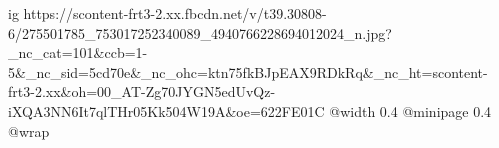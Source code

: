  
 
 
 
 

\ifcmt
  ig https://scontent-frt3-2.xx.fbcdn.net/v/t39.30808-6/275501785_753017252340089_4940766228694012024_n.jpg?_nc_cat=101&ccb=1-5&_nc_sid=5cd70e&_nc_ohc=ktn75fkBJpEAX9RDkRq&_nc_ht=scontent-frt3-2.xx&oh=00_AT-Zg70JYGN5edUvQz-iXQA3NN6It7qlTHr05Kk504W19A&oe=622FE01C
  @width 0.4
  @minipage 0.4
  @wrap \parpic[r]
\fi
